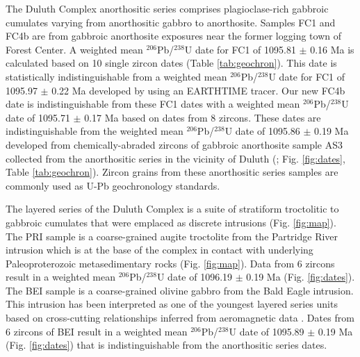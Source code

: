 \documentclass[11pt,letterpaper]{article}
\begin{document}
The Duluth Complex anorthositic series comprises plagioclase-rich gabbroic cumulates varying from anorthositic gabbro to anorthosite. Samples FC1 and FC4b are from gabbroic anorthosite exposures near the former logging town of Forest Center. A weighted mean $^{206}$Pb/$^{238}$U date for FC1 of 1095.81 $\pm$ 0.16 Ma is calculated based on 10 single zircon dates (Table \ref{tab:geochron}). This date is statistically indistinguishable from a weighted mean $^{206}$Pb/$^{238}$U date for FC1 of 1095.97 $\pm$ 0.22 Ma developed by \cite{Ibanez-Mejia2019a} using an EARTHTIME tracer. Our new FC4b date is indistinguishable from these FC1 dates with a weighted mean $^{206}$Pb/$^{238}$U date of 1095.71 $\pm$ 0.17 Ma based on dates from 8 zircons. These dates are indistinguishable from the weighted mean $^{206}$Pb/$^{238}$U date of 1095.86 $\pm$ 0.19 Ma developed from chemically-abraded zircons of gabbroic anorthosite sample AS3 collected from the anorthositic series in the vicinity of Duluth (\citealp{Schoene2006a}; Fig. \ref{fig:dates}, Table \ref{tab:geochron}). Zircon grains from these anorthositic series samples are commonly used as U-Pb geochronology standards.

The layered series of the Duluth Complex is a suite of stratiform troctolitic to gabbroic cumulates that were emplaced as discrete intrusions (Fig. \ref{fig:map}). The PRI sample is a coarse-grained augite troctolite from the Partridge River intrusion which is at the base of the complex in contact with underlying Paleoproterozoic metasedimentary rocks (Fig. \ref{fig:map}). Data from 6 zircons result in a weighted mean $^{206}$Pb/$^{238}$U date of 1096.19 $\pm$ 0.19 Ma (Fig. \ref{fig:dates}). The BEI sample is a coarse-grained olivine gabbro from the Bald Eagle intrusion. This intrusion has been interpreted as one of the youngest layered series units based on cross-cutting relationships inferred from aeromagnetic data \citep{Miller2002c}. Dates from 6 zircons of BEI result in a weighted mean $^{206}$Pb/$^{238}$U date of 1095.89 $\pm$ 0.19 Ma (Fig. \ref{fig:dates}) that is indistinguishable from the anorthositic series dates.
\end{document}
